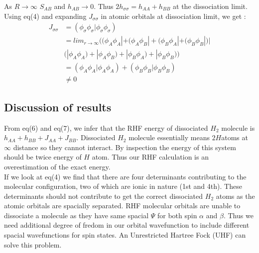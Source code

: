 \documentclass[11pt]{article}   	%
\begin{document}
	As $R\rightarrow \infty$ $S_{AB}$ and $h_{AB}\rightarrow 0$. Thus $2h_{\sigma \sigma}=h_{AA}+h_{BB}$ at the dissociation
	limit. Using eq(4) and expanding $J_{\sigma \sigma}$ in atomic orbitals at dissociation limit, we get :
	\begin{equation}
	\begin{split}
		J_{\sigma \sigma} &=(\phi_{\sigma} \phi_{\sigma}|\phi_{\sigma} \phi_{\sigma})\\
			&= lim_{r\rightarrow\infty}\big( (\phi_A\phi_A|+(\phi_A\phi_B|+(\phi_B\phi_A|
			+(\phi_B\phi_B|\big)\big|\\&    \big(|\phi_A\phi_A)+|\phi_A\phi_B)+|\phi_B\phi_A)+
			|\phi_B\phi_B)\big)\\
			&=(\phi_A\phi_A|\phi_A\phi_A)+(\phi_B\phi_B|\phi_B\phi_B)\\
			&\neq 0
	\end{split}
	\end{equation}
	\subsection{Discussion of results}
	From eq(6) and eq(7), we infer that the RHF energy of dissociated $H_2$ molecule is $h_{AA}+h_{BB}+
	J_{AA}+J_{BB}$. Dissociated $H_2$ molecule essentially means $ 2 H $atoms at $\infty$ distance so 
	they cannot interact. By inspection the energy of this system should be twice energy of $H$ atom. 
	Thus our RHF calculation is an overestimation of the exact energy.  \\
	If we look at eq(4) we find that there are four determinants contributing to the molecular configuration, two of which are ionic in nature (1st and 4th). 
	These determinants should not contribute to get the correct dissociated $H_2$ atoms as the atomic orbitals are spacially separated.
	RHF molecular orbitals are unable to dissociate a molecule as they have same spacial $\Psi$ 
	for both spin $\alpha$ and $\beta$. Thus we need additional degree of fredom in our 
	orbital wavefunction to include different spacial wavefunctions for spin states. An Unrestricted 
	Hartree Fock (UHF) can solve this problem. \\
\end{document}
